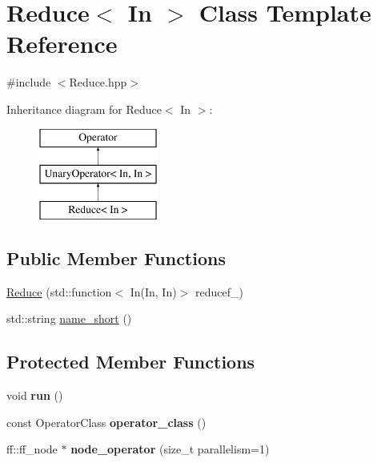\hypertarget{class_reduce}{\section{\-Reduce$<$ \-In $>$ \-Class \-Template \-Reference}
\label{class_reduce}
}


{\ttfamily \#include $<$\-Reduce.\-hpp$>$}

\-Inheritance diagram for \-Reduce$<$ \-In $>$\-:\begin{figure}[H]
\begin{center}
\leavevmode
\includegraphics[height=3.000000cm]{class_reduce}
\end{center}
\end{figure}
\subsection*{\-Public \-Member \-Functions}
\begin{DoxyCompactItemize}
\item 
\hyperlink{class_reduce_aca83bb85365a9f7063734f2fe9f98df5}{\-Reduce} (std\-::function$<$ \-In(\-In, \-In)$>$ reducef\-\_\-)
\item 
std\-::string \hyperlink{class_reduce_ac714421091164ce0c8e476f90b6002f0}{name\-\_\-short} ()
\end{DoxyCompactItemize}
\subsection*{\-Protected \-Member \-Functions}
\begin{DoxyCompactItemize}
\item 
\hypertarget{class_reduce_af3e480efa114503bb9bfc2ae363b0750}{void {\bfseries run} ()}\label{class_reduce_af3e480efa114503bb9bfc2ae363b0750}

\item 
\hypertarget{class_reduce_a2b550adc98a8dd58cfe14d51562712b2}{const \-Operator\-Class {\bfseries operator\-\_\-class} ()}\label{class_reduce_a2b550adc98a8dd58cfe14d51562712b2}

\item 
\hypertarget{class_reduce_a7bc3d784362c382ef7b8e0e8a4c3964c}{ff\-::ff\-\_\-node $\ast$ {\bfseries node\-\_\-operator} (size\-\_\-t parallelism=1)}\label{class_reduce_a7bc3d784362c382ef7b8e0e8a4c3964c}

\end{DoxyCompactItemize}
